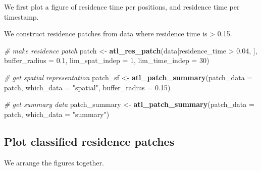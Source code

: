 \documentclass[
]{scrreprt}
\newenvironment{Shaded}{}{}
\newcommand{\CommentTok}[1]{\textcolor[rgb]{0.38,0.63,0.69}{\textit{#1}}}
\newcommand{\DataTypeTok}[1]{\textcolor[rgb]{0.56,0.13,0.00}{#1}}
\newcommand{\DecValTok}[1]{\textcolor[rgb]{0.25,0.63,0.44}{#1}}
\newcommand{\FloatTok}[1]{\textcolor[rgb]{0.25,0.63,0.44}{#1}}
\newcommand{\KeywordTok}[1]{\textcolor[rgb]{0.00,0.44,0.13}{\textbf{#1}}}
\newcommand{\NormalTok}[1]{#1}
\newcommand{\OperatorTok}[1]{\textcolor[rgb]{0.40,0.40,0.40}{#1}}
\newcommand{\StringTok}[1]{\textcolor[rgb]{0.25,0.44,0.63}{#1}}
\begin{document}
We first plot a figure of residence time per positions, and residence time per timestamp.

We construct residence patches from data where residence time is \textgreater{} 0.15.

\begin{Shaded}
\begin{Highlighting}[]
\CommentTok{\# make residence patch}
\NormalTok{patch <{-}}\StringTok{ }\KeywordTok{atl\_res\_patch}\NormalTok{(data[residence\_time }\OperatorTok{>}\StringTok{ }\FloatTok{0.04}\NormalTok{, ], }
                       \DataTypeTok{buffer\_radius =} \FloatTok{0.1}\NormalTok{, }
                       \DataTypeTok{lim\_spat\_indep =} \DecValTok{1}\NormalTok{, }
                       \DataTypeTok{lim\_time\_indep =} \DecValTok{30}\NormalTok{)}



\CommentTok{\# get spatial representation}
\NormalTok{patch\_sf <{-}}\StringTok{ }\KeywordTok{atl\_patch\_summary}\NormalTok{(}\DataTypeTok{patch\_data =}\NormalTok{ patch,}
                              \DataTypeTok{which\_data =} \StringTok{"spatial"}\NormalTok{, }
                              \DataTypeTok{buffer\_radius =} \FloatTok{0.15}\NormalTok{)}

\CommentTok{\# get summary data}
\NormalTok{patch\_summary <{-}}\StringTok{ }\KeywordTok{atl\_patch\_summary}\NormalTok{(}\DataTypeTok{patch\_data =}\NormalTok{ patch,}
                                   \DataTypeTok{which\_data =} \StringTok{"summary"}\NormalTok{)}
\end{Highlighting}
\end{Shaded}

\hypertarget{plot-classified-residence-patches}{%
\subsection{Plot classified residence patches}\label{plot-classified-residence-patches}}

We arrange the figures together.
\end{document}
